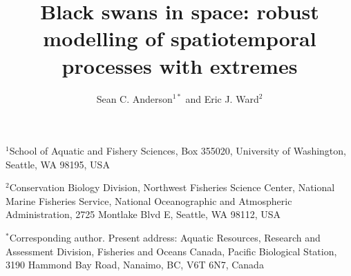 \documentclass[12pt,english]{article}
\title{
  \vspace{-1.4cm}
  Black swans in space:
  robust modelling of spatiotemporal processes with extremes}
\author{
Sean C. Anderson$^{1\ast}$ and
Eric J. Ward$^2$
}
\date{}
\begin{document}
\maketitle

$^1$School of Aquatic and Fishery Sciences, Box 355020, University of
Washington, Seattle, WA 98195, USA

$^2$Conservation Biology Division, Northwest Fisheries Science Center, National
Marine Fisheries Service, National Oceanographic and Atmospheric Administration,
2725 Montlake Blvd E, Seattle, WA 98112, USA

$^{\ast}$Corresponding author. Present address:
Aquatic Resources, Research and Assessment Division,
Fisheries and Oceans Canada,
Pacific Biological Station,
3190 Hammond Bay Road,
Nanaimo, BC, V6T 6N7, Canada

\RaggedRight
{}
\end{document}
